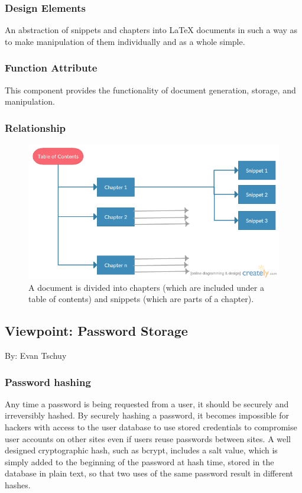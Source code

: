 \documentclass[onecolumn, draftclsnofoot,10pt, compsoc]{IEEEtran}
\begin{document}
\subsubsection{Design Elements}
\noindent An abstraction of snippets and chapters into LaTeX documents in 
such a way as to make manipulation of them individually and as a whole simple.
\\

\subsubsection{Function Attribute}
\noindent This component provides the functionality of document generation, 
storage, and manipulation. \\

\subsubsection{Relationship}
\begin{figure}[ht!]
\centering
\includegraphics[scale=0.5]{formatting.png}
\caption{A document is divided into chapters (which are included under a 
table of contents) and snippets (which are parts of a chapter).}
\end{figure}
\pagebreak

\subsection{Viewpoint: Password Storage}
\noindent By: Evan Tschuy \\

\subsubsection{Password hashing}
\noindent  Any time a password is being requested from a user, it should be 
securely and irreversibly hashed. By securely hashing a password, it becomes 
impossible for hackers with access to the user database to use stored 
credentials to compromise user accounts on other sites even if users reuse 
passwords between sites. A well designed cryptographic hash, such as bcrypt, 
includes a salt value, which is simply added to the beginning of the password 
at hash time, stored in the database in plain text, so that two uses of the 
same password result in different hashes. \\
\end{document}
